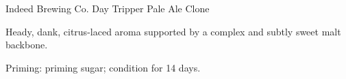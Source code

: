 \begin{recipe}{Indeed Brewing Co. Day Tripper Pale Ale Clone}

\begin{aboutblock}
Heady, dank, citrus-laced aroma supported by a complex and subtly sweet
malt backbone. \sourceaha
\end{aboutblock}


\begin{methodandtiming}
 
\begin{mashsteps}
\end{mashsteps}

\begin{fermentationsteps}
\end{fermentationsteps}

\begin{directions}
Priming:  priming sugar; condition for 14 days.
\end{directions}

\end{methodandtiming}

\recipebreak

\begin{ingredientsblock}

\begin{malts}

\end{malts}

\begin{hops}
\end{hops}


\end{ingredientsblock}

\end{recipe}

